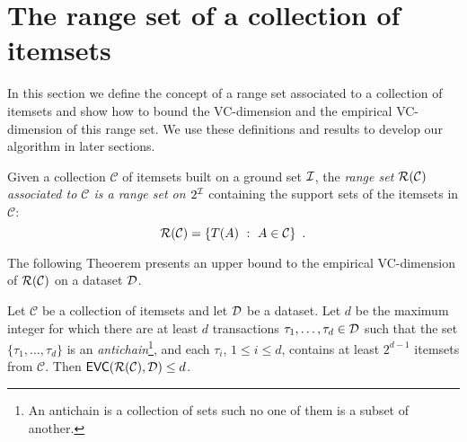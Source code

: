 \section{The range set of a collection of itemsets}\label{sec:range}
In this section we define the concept of a range set associated to a
collection of itemsets and show how to bound the VC-dimension and the
empirical VC-dimension of this range set. We use these definitions and results
to develop our algorithm in later sections.

\begin{definition}\label{def:rangeset}
Given a collection $\mathcal{C}$ of itemsets built on a ground set ${\cal I}$, the
\emph{range set $\mathcal{R}(\mathcal{C})$ associated to $\mathcal{C}$ is a range
set on $2^{\cal I}$} containing the support sets of the itemsets in $\mathcal{C}$:
\[\mathcal{R}(\mathcal{C})=\{T(A) ~:~ A\in\mathcal{C}\}\enspace.\]
\end{definition}

The following Theoerem presents an upper bound to the empirical VC-dimension of
$\mathcal{R}(\mathcal{C})$ on a dataset ${\cal D}$.

\begin{theorem}\label{lem:evcdimupbound}
  Let $\mathcal{C}$ be a collection of itemsets and let ${\cal D}$ be a dataset. Let
  $d$ be the maximum integer for which there are at least $d$
  transactions $\tau_1,\dotsc,\tau_d\in {\cal D}$ such that the set
  $\{\tau_1,\dotsc,\tau_d\}$ is an \emph{antichain}\footnote{An antichain is a
  collection of sets such no one of them is a subset of another.}, and each $\tau_i$, $1\le i\le d$,
  contains at least $2^{d-1}$ itemsets from $\mathcal{C}$. 
  Then $\mathsf{EVC}(\mathcal{R}(\mathcal{C}),{\cal D})\le d$.
\end{theorem}

